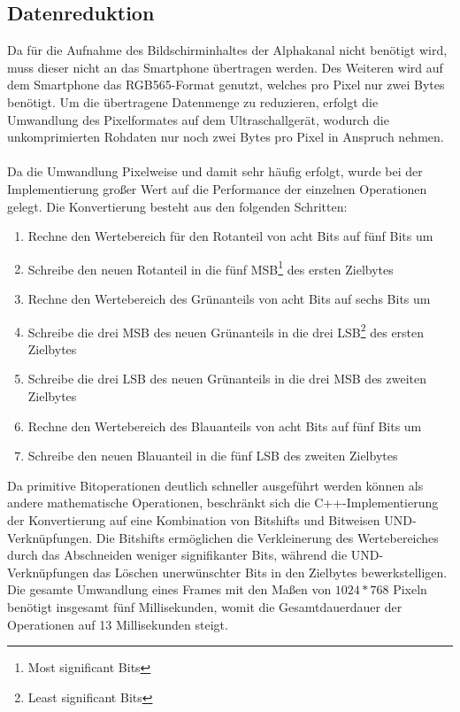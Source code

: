 \subsection{Datenreduktion}
Da für die Aufnahme des Bildschirminhaltes der Alphakanal nicht benötigt wird, muss dieser nicht an das Smartphone übertragen werden. Des Weiteren wird auf dem Smartphone das RGB565-Format genutzt, welches pro Pixel nur zwei Bytes benötigt. Um die übertragene Datenmenge zu reduzieren, erfolgt die Umwandlung des Pixelformates auf dem Ultraschallgerät, wodurch die unkomprimierten Rohdaten nur noch zwei Bytes pro Pixel in Anspruch nehmen.\\
\\
Da die Umwandlung Pixelweise und damit sehr häufig erfolgt, wurde bei der Implementierung großer Wert auf die Performance der einzelnen Operationen gelegt. Die Konvertierung besteht aus den folgenden Schritten:
\begin{enumerate}
\item{Rechne den Wertebereich für den Rotanteil von acht Bits auf fünf Bits um}
\item{Schreibe den neuen Rotanteil in die fünf MSB\footnote{Most significant Bits} des ersten Zielbytes}
\item{Rechne den Wertebereich des Grünanteils von acht Bits auf sechs Bits um}
\item{Schreibe die drei MSB des neuen Grünanteils in die drei LSB\footnote{Least significant Bits} des ersten Zielbytes}
\item{Schreibe die drei LSB des neuen Grünanteils in die drei MSB des zweiten Zielbytes}
\item{Rechne den Wertebereich des Blauanteils von acht Bits auf fünf Bits um}
\item{Schreibe den neuen Blauanteil in die fünf LSB des zweiten Zielbytes}
\end{enumerate}

Da primitive Bitoperationen deutlich schneller ausgeführt werden können als andere mathematische Operationen, beschränkt sich die C++-Implementierung der Konvertierung auf eine Kombination von Bitshifts und Bitweisen UND-Verknüpfungen. Die Bitshifts ermöglichen die Verkleinerung des Wertebereiches durch das Abschneiden weniger signifikanter Bits, während die UND-Verknüpfungen das Löschen unerwünschter Bits in den Zielbytes bewerkstelligen.\\
Die gesamte Umwandlung eines Frames mit den Maßen von $1024*768$ Pixeln benötigt insgesamt fünf Millisekunden, womit die Gesamtdauerdauer der Operationen auf 13 Millisekunden steigt.

